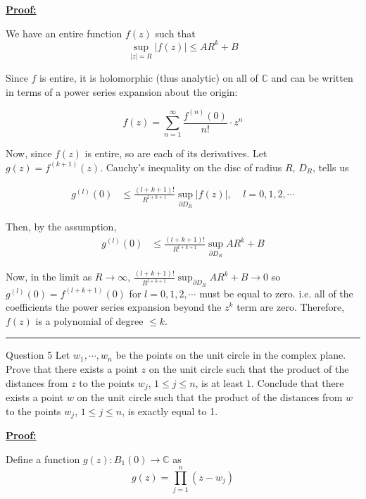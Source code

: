 \documentclass{article}
\newcommand{\C}{\mathbb{C}}
\begin{document}
\vskip 0.5cm
\underline{\textbf{Proof:}}

We have an entire function $f(z)$ such that 
\[ \sup_{|z| = R} \left| f(z) \right| \leq AR^k + B  \]

\vskip 0.5cm
Since $f$ is entire, it is holomorphic (thus analytic) on all of $\C$ and can be written in terms of a power series expansion about the origin:

\[ f(z) = \sum_{n = 1}^{\infty} \frac{f^{(n)}(0)}{n!} \cdot z^n \]

\vskip 0.5cm
Now, since $f(z)$ is entire, so are each of its derivatives. Let $g(z) = f^{(k+1)}(z)$. Cauchy's inequality on the disc of radius $R$, $D_R$, tells us 

\begin{align*}
  g^{(l)}(0) &\leq \frac{(l + k + 1)!}{R^{l + k + 1}} \sup_{\partial D_R} |f(z)|, \;\;\;\;l = 0, 1, 2, \cdots
\end{align*}

Then, by the assumption,
\begin{align*}
  g^{(l)}(0) &\leq \frac{(l + k + 1)!}{R^{l + k + 1}} \sup_{\partial D_R} AR^k + B
\end{align*}

Now, in the limit as $R \rightarrow \infty$, $\frac{(l + k + 1)!}{R^{l + k + 1}} \sup_{\partial D_R} AR^k + B \rightarrow 0$ so $g^{(l)}(0) = f^{(l + k + 1)}(0)$ for $l = 0, 1, 2, \cdots$ must be equal to zero. i.e. all of the coefficients the power series expansion beyond the $z^k$ term are zero. Therefore, $f(z)$ is a polynomial of degree $\leq k$.


\vskip 0.5cm
\hrule 
\vskip 0.5cm



\begin{mathdefinitionbox}{Question 5}
\vskip 0.5cm
Let $w_1, \cdots, w_n$ be the points on the unit circle in the complex plane. Prove that there exists a point $z$ on the unit circle such that the product of the distances from $z$ to the points $w_j$, $1 \leq j \leq n$, is at least $1$. Conclude that there exists a point $w$ on the unit circle such that the product of the distances from $w$ to the points $w_j$, $1 \leq j \leq n$, is exactly equal to 1.
\end{mathdefinitionbox}

\vskip 0.5cm
\underline{\textbf{Proof:}}

Define a function $g(z) : B_1(0) \rightarrow \C$ as 
\[ g(z) = \prod_{j = 1}^{n} (z - w_j) \]
\end{document}
